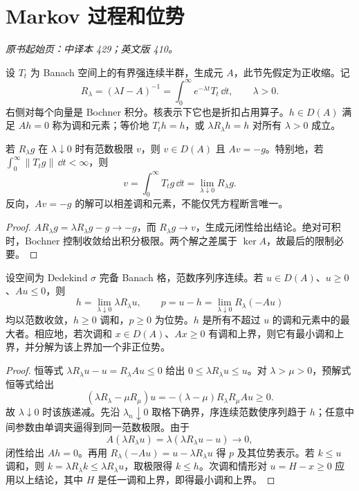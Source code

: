 \section{Markov 过程和位势}\label{sec:yosida-13-08}
\noindent\textit{原书起始页：中译本 429；英文版 410。}

设 $T_t$ 为 Banach 空间上的有界强连续半群，生成元 $A$，此节先假定为正收缩。记
\[
 R_\lambda=(\lambda I-A)^{-1}
 =\int_0^\infty e^{-\lambda t}T_t\,\dd t,\qquad\lambda>0.
\]
右侧对每个向量是 Bochner 积分。核表示下它也是折扣占用算子。$h\in D(A)$ 满足 $Ah=0$ 称为调和元素；等价地 $T_th=h$，或 $\lambda R_\lambda h=h$ 对所有 $\lambda>0$ 成立。

\begin{proposition}\label{prop:y13-poisson}
若 $R_\lambda g$ 在 $\lambda\downarrow0$ 时有范数极限 $v$，则 $v\in D(A)$ 且 $Av=-g$。特别地，若 $\int_0^\infty\|T_tg\|\,\dd t<\infty$，则
\[
 v=\int_0^\infty T_tg\,\dd t=\lim_{\lambda\downarrow0}R_\lambda g.
\]
反向，$Av=-g$ 的解可以相差调和元素，不能仅凭方程断言唯一。
\end{proposition}
\begin{proof}
$AR_\lambda g=\lambda R_\lambda g-g\to-g$，而 $R_\lambda g\to v$，生成元闭性给出结论。绝对可积时，Bochner 控制收敛给出积分极限。两个解之差属于 $\ker A$，故最后的限制必要。
\end{proof}

\begin{theorem}\label{thm:y13-riesz-potential}
设空间为 Dedekind $\sigma$ 完备 Banach 格，范数序列序连续。若 $u\in D(A)$、$u\ge0$、$Au\le0$，则
\[
 h=\lim_{\lambda\downarrow0}\lambda R_\lambda u,\qquad
 p=u-h=\lim_{\lambda\downarrow0}R_\lambda(-Au)
\]
均以范数收敛，$h\ge0$ 调和，$p\ge0$ 为位势。$h$ 是所有不超过 $u$ 的调和元素中的最大者。相应地，若次调和 $x\in D(A)$、$Ax\ge0$ 有调和上界，则它有最小调和上界，并分解为该上界加一个非正位势。
\end{theorem}
\begin{proof}
恒等式 $\lambda R_\lambda u-u=R_\lambda Au\le0$ 给出 $0\le\lambda R_\lambda u\le u$。对 $\lambda>\mu>0$，预解式恒等式给出
\[
 (\lambda R_\lambda-\mu R_\mu)u
 =-(\lambda-\mu)R_\lambda R_\mu Au\ge0.
\]
故 $\lambda\downarrow0$ 时该族递减。先沿 $\lambda_n\downarrow0$ 取格下确界，序连续范数使序列趋于 $h$；任意中间参数由单调夹逼得到同一范数极限。由于
\[
 A(\lambda R_\lambda u)=\lambda(\lambda R_\lambda u-u)\longrightarrow0,
\]
闭性给出 $Ah=0$。再用 $R_\lambda(-Au)=u-\lambda R_\lambda u$ 得 $p$ 及其位势表示。若 $k\le u$ 调和，则 $k=\lambda R_\lambda k\le\lambda R_\lambda u$，取极限得 $k\le h$。次调和情形对 $u=H-x\ge0$ 应用以上结论，其中 $H$ 是任一调和上界，即得最小调和上界。
\end{proof}

